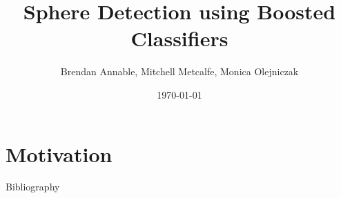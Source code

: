 \documentclass{beamer}
\title{Sphere Detection using Boosted Classifiers}
\author{Brendan Annable, Mitchell Metcalfe, Monica Olejniczak}
\institute{The University of Newcastle, Australia}
\date{\today}
\begin{document}
	\maketitle

	\section{Motivation}
	
			













	\begin{frame}{Bibliography}
		
    	
	\end{frame}
\end{document}
